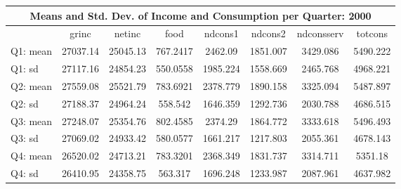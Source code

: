 \begin{tabular}{l*{7}{c}}
\hline\hline
\multicolumn{8}{c}{Means and Std. Dev. of Income and Consumption per Quarter: 2000}  \\
\hline    
            &       grinc&      netinc&        food&     ndcons1&     ndcons2&  ndconsserv&     totcons\\
\hline
Q1: mean     &    27037.14&    25045.13&    767.2417&     2462.09&    1851.007&    3429.086&    5490.222\\
Q1: sd &    27117.16&    24854.23&    550.0558&    1985.224&    1558.669&    2465.768&    4968.221\\
Q2: mean    &    27559.08&    25521.79&    783.6921&    2378.779&    1890.158&    3325.094&    5487.897\\
Q2: sd    &    27188.37&    24964.24&     558.542&    1646.359&    1292.736&    2030.788&    4686.515\\
Q3: mean    &    27248.07&    25354.76&    802.4585&     2374.29&    1864.772&    3333.618&    5496.493\\
Q3: sd    &    27069.02&    24933.42&    580.0577&    1661.217&    1217.803&    2055.361&    4678.143\\
Q4: mean     &    26520.02&    24713.21&    783.3201&    2368.349&    1831.737&    3314.711&     5351.18\\
Q4: sd    &    26410.95&    24358.75&     563.317&    1696.248&    1233.987&    2087.961&    4637.982\\
\hline\hline
\end{tabular}
